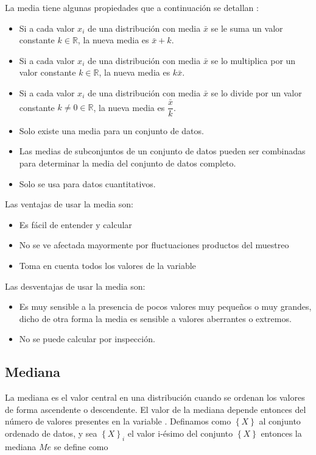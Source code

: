 \documentclass[
]{krantz}
\providecommand{\tightlist}{%
  \setlength{\itemsep}{0pt}\setlength{\parskip}{0pt}}
\begin{document}
La media tiene algunas propiedades que a continuación se detallan \citep{uboe2017}:

\begin{itemize}
\tightlist
\item
  Si a cada valor \(x_i\) de una distribución con media \(\bar{x}\) se le suma un valor constante \(k \in \mathbb{R}\), la nueva media es \(\bar{x}+k\).
\item
  Si a cada valor \(x_i\) de una distribución con media \(\bar{x}\) se lo multiplica por un valor constante \(k \in \mathbb{R}\), la nueva media es \(k\bar{x}\).
\item
  Si a cada valor \(x_i\) de una distribución con media \(\bar{x}\) se lo divide por un valor constante \(k \neq 0 \in \mathbb{R}\), la nueva media es \(\dfrac{\bar{x}}{k}\).
\item
  Solo existe una media para un conjunto de datos.
\item
  Las medias de subconjuntos de un conjunto de datos pueden ser combinadas para determinar la media del conjunto de datos completo.
\item
  Solo se usa para datos cuantitativos.
\end{itemize}

Las ventajas de usar la media son:

\begin{itemize}
\tightlist
\item
  Es fácil de entender y calcular
\item
  No se ve afectada mayormente por fluctuaciones productos del muestreo
\item
  Toma en cuenta todos los valores de la variable
\end{itemize}

Las desventajas de usar la media son:

\begin{itemize}
\tightlist
\item
  Es muy sensible a la presencia de pocos valores muy pequeños o muy grandes, dicho de otra forma la media es sensible a valores aberrantes o extremos.
\item
  No se puede calcular por inspección.
\end{itemize}

\hypertarget{mediana}{%
\subsection{Mediana}\label{mediana}}

La mediana es el valor central en una distribución cuando se ordenan los valores de forma ascendente o descendente. El valor de la mediana depende entonces del número de valores presentes en la variable \citep{barrow2006}. Definamos como \(\left\{ X \right \}\) al conjunto ordenado de datos, y sea \(\left \{ X \right \}_i\) el valor i-ésimo del conjunto \(\left \{ X \right \}\) entonces la mediana \(Me\) se define como
\end{document}
